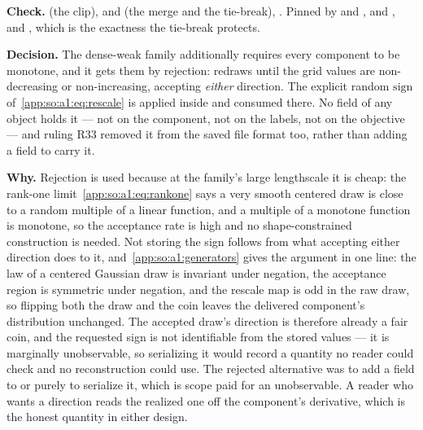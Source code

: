 \begin{sloppypar}
\textbf{Check.}  (the clip),
 and  (the merge and
the tie-break), . Pinned by
 and
,
 and
, and
, which
is the exactness the tie-break protects.
\end{sloppypar}

\label{app:so:a4:d4}

\textbf{Decision.} The dense-weak family additionally requires every component
to be monotone, and it gets them by rejection: 
redraws until the grid values are non-decreasing or non-increasing, accepting
\emph{either} direction. The explicit random $\mathrm{sign}$
of~\eqref{app:so:a1:eq:rescale} is applied inside 
and consumed there. No field of any object holds it --- not on the component,
not on the labels, not on the objective --- and ruling R33 removed it from the
saved file format too, rather than adding a field to carry it.

\textbf{Why.} Rejection is used because at the family's large lengthscale it is
cheap: the rank-one limit~\eqref{app:so:a1:eq:rankone} says a very smooth
centered draw is close to a random multiple of a linear function, and a
multiple of a monotone function is monotone, so the acceptance rate is high and
no shape-constrained construction is needed. Not storing the sign follows from
what accepting either direction does to it, and~\ref{app:so:a1:generators}
gives the argument in one line: the law of a centered Gaussian draw is
invariant under negation, the acceptance region is symmetric under negation,
and the rescale map is odd in the raw draw, so flipping both the draw and the
coin leaves the delivered component's distribution unchanged. The accepted
draw's direction is therefore already a fair coin, and the requested sign is
not identifiable from the stored values --- it is marginally unobservable, so
serializing it would record a quantity no reader could check and no
reconstruction could use. The rejected alternative was to add a field to
 or  purely to serialize it, which is scope
paid for an unobservable. A reader who wants a direction reads the realized one
off the component's derivative, which is the honest quantity in either design.

